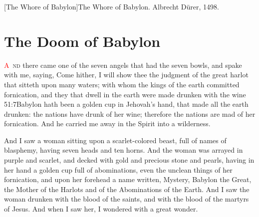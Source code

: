 [The Whore of Babylon]{The Whore of Babylon. Albrecht Dürer, 1498.}

\chapter{The Doom of Babylon}
\lettrine[lines=3,slope=0.5em]{\textcolor{red}{A}}{\ nd} there came one of the seven angels that had the seven bowls, and spake with me, saying, Come hither, I will show thee the judgment of the great harlot that sitteth upon many waters;%
with whom the kings of the earth committed fornication,%
 and they that dwell in the earth were made drunken with the wine%
					  {51:7}{Babylon hath been a golden cup in Jehovah’s hand, that made all the earth drunken: the nations have drunk of her wine; therefore the nations are mad}
 of her fornication.%
And he carried me away in the Spirit into a wilderness. 

And I saw a woman sitting upon a scarlet-colored beast, full of names of blasphemy, having seven heads and ten horns. 
And the woman was arrayed in purple and scarlet, and decked with gold and precious stone and pearls,%
 having in her hand a golden cup full of abominations, even the unclean things of her fornication, 
and upon her forehead a name written, Mystery, Babylon the Great, the Mother of the Harlots and of the Abominations of the Earth. 
And I saw the woman drunken with the blood of the saints, and with the blood of the martyrs of Jesus. And when I saw her, I wondered with a great wonder. 


